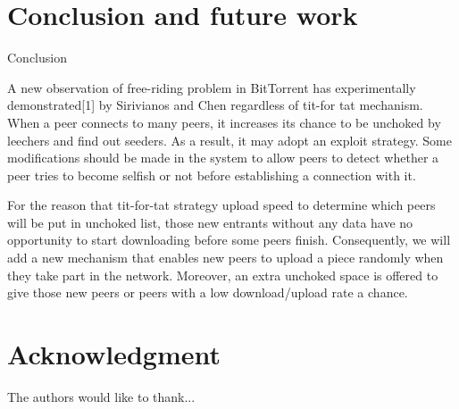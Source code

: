 \documentclass[conference]{IEEEtran}
\begin{document}
	
	\section{Conclusion and future work}
Conclusion
	
	A new observation of free-riding problem in BitTorrent has experimentally demonstrated[1] by Sirivianos and Chen regardless of tit-for tat mechanism. When a peer connects to many peers, it increases its chance to be unchoked by leechers and find out seeders. As a result, it may adopt an exploit strategy. Some modifications should be made in the system to allow peers to detect whether a peer tries to become selfish or not before establishing a connection with it.
	
	For the reason that tit-for-tat strategy upload speed to determine which peers will be put in unchoked list, those new entrants without any data have no opportunity to start downloading before some peers finish. Consequently, we will add a new mechanism that enables new peers to upload a piece randomly when they take part in the network. Moreover, an extra unchoked space is offered to give those new peers or peers with a low download/upload rate a chance.

	
	
	\section*{Acknowledgment}
	
	
	The authors would like to thank...
	
	
	
	
	
	
	
\end{document}
